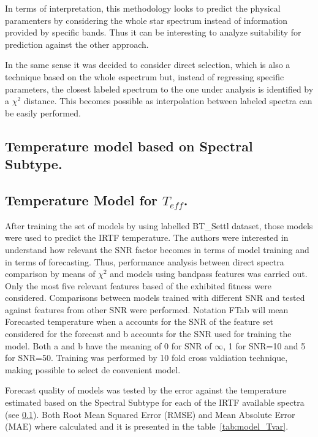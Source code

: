 In terms of interpretation, this methodology looks to predict the physical paramenters
by considering the whole star spectrum instead of information provided 
by specific bands. Thus it can be interesting to analyze suitability 
for prediction against the other approach.

In the same sense it was decided to consider direct selection, which is
also a technique based on the whole espectrum but, instead of regressing
specific parameters, the closest labeled spectrum to the one 
under analysis is identified by a $\chi^2$ distance.
This becomes possible as interpolation between labeled spectra can be
easily performed.



\subsection{Temperature model based on Spectral Subtype.}
\label {ssub:TLSB}



\subsection{Temperature Model for $T_{eff}$.}
\label {ssub:teff_model}

After training the set of models by using labelled BT\_Settl dataset, those models 
were used to predict the IRTF temperature.
The authors were interested in understand how relevant the SNR factor 
becomes in terms of model training and in terms of forecasting. Thus, 
performance analysis between direct spectra comparison by means of $ \chi^2 $ and 
models using bandpass features was carried out.
Only the most five relevant features based of the exhibited fitness were considered.
Comparisons between models trained with different SNR and tested against 
features from other SNR were performed. Notation FTab will mean Forecasted temperature
when a accounts for the SNR of the feature set considered for the forecast and b
accounts for the SNR used for training the model. Both a and b have the 
meaning of 0 for SNR of $\infty$, 1 for SNR=10 and 5 for SNR=50.
Training was performed by 10 fold cross valdiation technique, making possible 
to select de convenient model.

Forecast quality of models was tested by the error against the temperature 
estimated based on the Spectral Subtype for each of 
the IRTF available spectra (see \ref{ssub:TLSB}).
Both Root Mean Squared Error (RMSE) and Mean Absolute Error (MAE) where calculated 
and it is presented in the table~\ref{tab:model_Tvar}.

